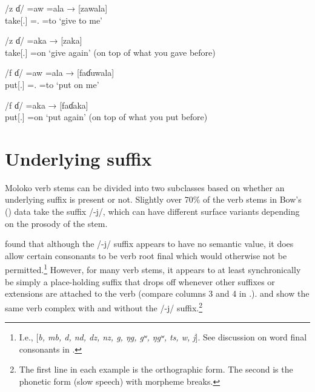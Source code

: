 \ea \label{ex:6:1}
/z ɗ/ \hspace{29pt} =aw \hspace{5pt}  =ala  \hspace{1pt} → \hspace{3pt} [zawala]\\
\glt  take[{\twoS}.{\IMP}]  ={\oneS}.{\IO}   =to   \hspace{25pt}   ‘give to me’\\
\z

\ea \label{ex:6:2}
/z ɗ/ \hspace{31pt} =aka   \hspace{24pt}    → \hspace{3pt} [zaka]\\
\glt  take[{\twoS}.{\IMP}]  =on    \hspace{50pt}     ‘give again’ (on top of what you gave before)
\z

\ea \label{ex:6:3}
/f ɗ/ \hspace{27pt} =aw \hspace{5pt} =ala  \hspace{1pt}   → \hspace{3pt} [faɗuwala]\\
\glt  put[{\twoS}.{\IMP}]    ={\oneS}.{\IO}  =to   \hspace{25pt}    ‘put on me’
\z

\ea \label{ex:6:4}
/f ɗ/ \hspace{29pt} =aka   \hspace{24pt}    → \hspace{3pt} [faɗaka]\\
\glt  put[{\twoS}.{\IMP}]  =on    \hspace{50pt}     ‘put again’ (on top of what you put before)
\z

\section{Underlying suffix}\label{sec:6.3}
\hypertarget{RefHeading1211941525720847}{}
Moloko verb stems can be divided into two subclasses based on whether an underlying suffix is present or not. Slightly over 70\% of the verb stems in Bow’s (\citeyear{Bow1997c}) data take the suffix /-j/, which can have different surface variants depending on the prosody of the stem. 

\citeyear{FriesenMamalis2008} found that although the /-j/ suffix appears to have no semantic value, it does allow certain consonants to be verb root final which would otherwise not be permitted.\footnote{I.e., [\textit{b, mb, d, nd, dz, nz, g, ŋg, gʷ, ŋgʷ, ts, w, j}]. See discussion on word final consonants in .}  However, for many verb stems, it appears to at least synchronically be simply a place-holding suffix that drops off whenever other suffixes or extensions are attached to the verb (compare columns 3 and 4 in .).  and  show the same verb complex with  and without  the /-j/ suffix.\footnote{The first line in each example is the orthographic form. The second is the phonetic form (slow speech) with morpheme breaks.}


